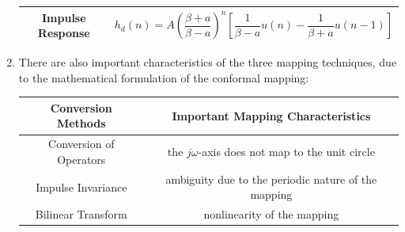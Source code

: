 \documentclass{article}
\begin{document}
\begin{enumerate}
\begin{table}[h]
\begin{tabular}{|c|c|}
    Impulse Response
    &
    $h_d(n)
    =
    A\left(\dfrac{\beta+a}{\beta-a}\right)^n
    \left[
    \dfrac{1}{\beta-a}u(n)
    -
    \dfrac{1}{\beta+a}u(n-1)
    \right]$
    \\ \hline

    \end{tabular}
    \end{table}
    \item There are also important characteristics of the three mapping techniques, due to the mathematical formulation of the conformal mapping:
    \begin{table}[h]
\centering
\begin{tabular}{|c|c|}
\hline
\textbf{Conversion Methods} & \textbf{Important Mapping Characteristics} \\ \hline

Conversion of Operators
&
the $j\omega$-axis does not map to the unit circle
\\ \hline

Impulse Invariance
&
ambiguity due to the periodic nature of the mapping
\\ \hline

Bilinear Transform
&
nonlinearity of the mapping
\\ \hline

\end{tabular}
\end{table}
    \end{enumerate}
\end{document}
